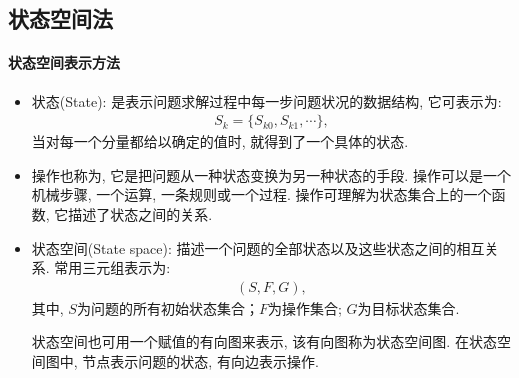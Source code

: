 \subsection{状态空间法}
\paragraph{状态空间表示方法}
\begin{itemize}
\item 状态(State): 是表示问题求解过程中每一步问题状况的数据结构, 它可表示为:
\begin{align}
  S_k=\{S_{k0}, S_{k1}, \cdots\},
\end{align}
当对每一个分量都给以确定的值时, 就得到了一个具体的状态.

\item 操作也称为, 它是把问题从一种状态变换为另一种状态的手段.
操作可以是一个机械步骤, 一个运算, 一条规则或一个过程. 操作可理解为状态集合上的一个函数, 它描述了状态之间的关系.

\item 状态空间(State space): 描述一个问题的全部状态以及这些状态之间的相互关系. 常用三元组表示为:
\begin{align}
  (S, F, G),
\end{align}
其中, $S$为问题的所有初始状态集合；$F$为操作集合; $G$为目标状态集合.

\begin{remark}
  状态空间也可用一个赋值的有向图来表示, 该有向图称为状态空间图. 在状态空间图中, 节点表示问题的状态, 有向边表示操作.
\end{remark}
\end{itemize}
